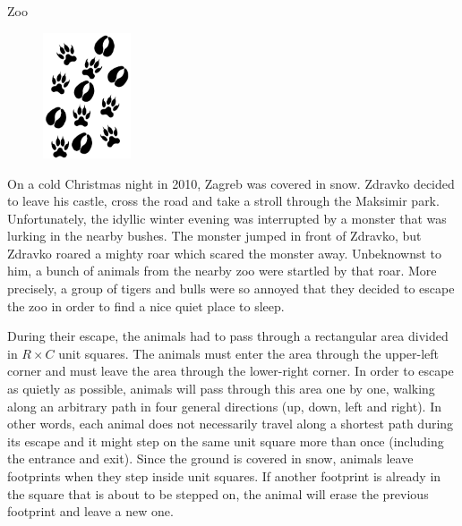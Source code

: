 \begin{statement}[
  problempoints=110,
  timelimit=1 second,
  memorylimit=512 MiB,
]{Zoo}

\setlength\intextsep{-0.1cm}
\begin{figure}
\centering
\includegraphics[width=0.23\textwidth]{img/tragovi.png}
\end{figure}


On a cold Christmas night in 2010, Zagreb was covered in snow.
Zdravko decided to leave his castle, cross the road and take a stroll through
the Maksimir park. Unfortunately, the idyllic winter evening was interrupted by
a monster that was lurking in the nearby bushes. The monster jumped in front of
Zdravko, but Zdravko roared a mighty roar which scared the monster away.
Unbeknownst to him, a bunch of animals from the nearby zoo were startled by
that roar. More precisely, a group of tigers and bulls were so annoyed that they
decided to escape the zoo in order to find a nice quiet place to sleep.

During their escape, the animals had to pass through a rectangular area divided
in $R \times C$ unit squares. The animals must enter the area through the
upper-left corner and must leave the area through the lower-right corner. In
order to escape as quietly as possible, animals will pass through this area
one by one, walking along an arbitrary path in four general directions (up,
down, left and right). In other words, each animal does
not necessarily travel along a shortest path during its escape
and it might step on the same unit square more than once (including the entrance
and exit). Since the ground is covered in snow, animals leave footprints when
they step inside unit squares. If another footprint is already in the square
that is about to be stepped on, the animal will erase the previous footprint and
leave a new one.


\end{statement}
